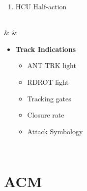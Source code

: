 \documentclass[fontInter]{TechCheck}
\begin{document}
\begin{listlongtable}
\begin{minipage}[t]{\linewidth}
\begin{itemize}
\begin{enumerate}[label=(\alph*), resume]
					\item HCU Half-action
				\end{enumerate}
			\end{itemize}
		\end{minipage} \\
		\midrule
		\textbf{\textbullet} &  &
		\begin{minipage}[t]{\linewidth}
			\vspace{-7pt}
			\begin{itemize}
				\item \textbf{Track Indications}
				\begin{itemize}
					\item ANT TRK light
					\item RDROT light
					\item Tracking gates
					\item Closure rate
					\item Attack Symbology
				\end{itemize}
			\end{itemize}
		\end{minipage} \\
	\end{listlongtable}

	\section{ACM}
\end{document}
